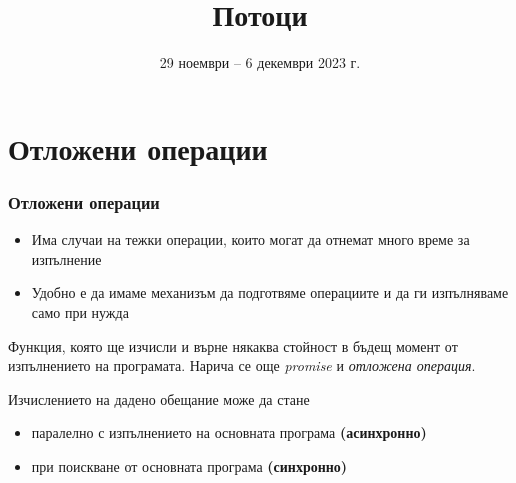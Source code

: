 \documentclass[alsotrans]{beamerswitch}
\title{Потоци}
\date[29.11--6.12.2023]{29 ноември -- 6 декември 2023 г.}
\begin{document}
\begin{frame}
  \titlepage
\end{frame}

\section{Отложени операции}

\begin{frame}
  \frametitle{Отложени операции}

  \begin{itemize}[<+->]
  \item Има случаи на тежки операции, които могат да отнемат много време за изпълнение
  \item Удобно е да имаме механизъм да \alert{подготвяме} операциите и да ги \alert{изпълняваме} само при нужда
  \end{itemize}
  \onslide<+->
  \begin{definition}[Обещание]
    Функция, която ще изчисли и върне някаква стойност в бъдещ момент от изпълнението на програмата.
    \onslide<+->
    Нарича се още \emph{promise} и \emph{отложена операция}.
  \end{definition}
  \onslide<+->
  Изчислението на дадено обещание може да стане
  \begin{itemize}[<+->]
  \item паралелно с изпълнението на основната програма \textbf{(асинхронно)}
  \item при поискване от основната програма \textbf{(синхронно)}
  \end{itemize}
\end{frame}
\end{document}
